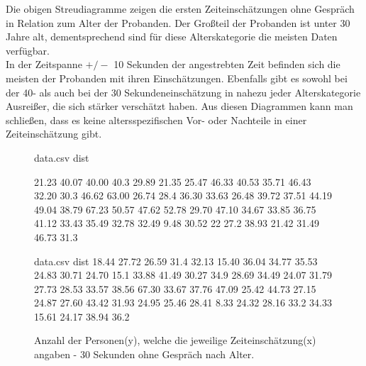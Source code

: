 \documentclass{Paper}
\begin{document}
Die obigen Streudiagramme zeigen die ersten Zeiteinschätzungen ohne Gespräch in Relation zum Alter der Probanden. Der Großteil der Probanden ist unter 30 Jahre alt, dementsprechend sind für diese Alterskategorie die meisten Daten verfügbar.\\
In der Zeitspanne $+/-$ 10 Sekunden der angestrebten Zeit befinden sich die meisten der Probanden mit ihren Einschätzungen. Ebenfalls gibt es sowohl bei der 40- als auch bei der 30 Sekundeneinschätzung in nahezu jeder Alterskategorie Ausreißer, die sich stärker verschätzt haben. Aus diesen Diagrammen kann man schließen, dass es keine altersspezifischen Vor- oder Nachteile in einer Zeiteinschätzung gibt.



\begin{figure}[H]
\begin{filecontents}{data.csv}
dist

21.23 
40.07 
40.00 
40.3 
29.89
21.35 
25.47
 46.33 
  40.53 
 35.71 
 46.43 
32.20 
 30.3 
 46.62 
 63.00 
 26.74 
 28.4 
 36.30 
 33.63 
 26.48 
 39.72 
37.51 
 44.19 
 49.04 
38.79 
 67.23 
 50.57 
47.62 
52.78 
 29.70 
 47.10 
 34.67 
33.85 
36.75 
 41.12 
 33.43 
 35.49 
 32.78 
 32.49
 9.48 
 30.52 
 22 
  27.2 
 38.93 
 21.42 
 31.49 
46.73 
 31.3 
\end{filecontents}
\begin{minipage}[t]{0.49\linewidth}
\caption{Anzahl der Personen(y), welche die jeweilige Zeiteinschätzung(x) angaben - 40 Sekunden ohne Gespräch nach Alter.}
\label{HistZeit40sek}
\end{minipage}
\hfill
\begin{filecontents}{data.csv}
dist
 18.44 
 27.72 
 26.59 
 31.4 
 32.13 
 15.40 
 36.04 
 34.77 
 35.53 
 24.83 
 30.71 
 24.70 
 15.1 
 33.88 
 41.49 
 30.27 
 34.9 
 28.69 
 34.49 
 24.07 
 31.79 
 27.73 
 28.53 
 33.57 
 38.56
 67.30 
 33.67 
 37.76 
 47.09 
25.42 
44.73 
 27.15 
 24.87 
 27.60 
 43.42 
 31.93 
 24.95 
 25.46 
 28.41 
 8.33 
 24.32 
 28.16 
 33.2 
 34.33 
 15.61 
 24.17 
38.94 
 36.2 
\end{filecontents}
\begin{minipage}[t]{0.49\linewidth}
\caption{Anzahl der Personen(y), welche die jeweilige Zeiteinschätzung(x) angaben - 30 Sekunden ohne Gespräch nach Alter.}
\label{HistZeit30sek}
\end{minipage}
\end{figure}
\end{document}
